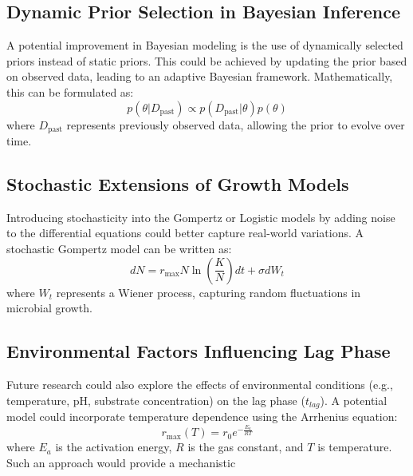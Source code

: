 

\subsection{Dynamic Prior Selection in Bayesian Inference}
A potential improvement in Bayesian modeling is the use of dynamically selected priors instead of static priors. This could be achieved by updating the prior based on observed data, leading to an adaptive Bayesian framework. Mathematically, this can be formulated as:
\begin{equation}
    p(\theta | D_{\text{past}}) \propto p(D_{\text{past}} | \theta) p(\theta)
\end{equation}
where $D_{\text{past}}$ represents previously observed data, allowing the prior to evolve over time.

\subsection{Stochastic Extensions of Growth Models}
Introducing stochasticity into the Gompertz or Logistic models by adding noise to the differential equations could better capture real-world variations. A stochastic Gompertz model can be written as:
\begin{equation}
    dN = r_{\max} N \ln \left(\frac{K}{N} \right) dt + \sigma dW_t
\end{equation}
where $W_t$ represents a Wiener process, capturing random fluctuations in microbial growth.

\subsection{Environmental Factors Influencing Lag Phase}
Future research could also explore the effects of environmental conditions (e.g., temperature, pH, substrate concentration) on the lag phase ($t_{lag}$). A potential model could incorporate temperature dependence using the Arrhenius equation:
\begin{equation}
    r_{\max}(T) = r_0 e^{-\frac{E_a}{RT}}
\end{equation}
where $E_a$ is the activation energy, $R$ is the gas constant, and $T$ is temperature. Such an approach would provide a mechanistic

\documentclass{article}
\usepackage{tikz}
\usetikzlibrary{shapes.geometric, arrows}

 = [rectangle, rounded corners, minimum width=4cm, minimum height=1cm,text centered, draw=black, fill=blue!20]
 = [rectangle, minimum width=6cm, minimum height=1cm, text centered, draw=black, fill=green!20]
 = [rectangle, minimum width=6cm, minimum height=1cm, text centered, draw=black, fill=orange!20]
 = [thick,->,>=stealth]


